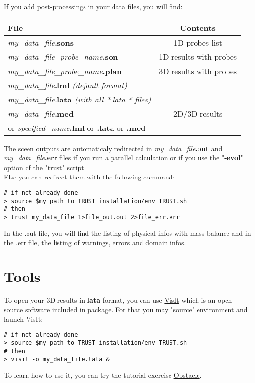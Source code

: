 If you add post-processings in your data files, you will find:

\begin{longtable}{|l|c|}
\hline \textbf{File}                                    & \textbf{Contents} \\ \hline \hline
\textit{my\_data\_file}\textbf{.sons}                          & 1D probes list \\ \hline
\textit{my\_data\_file\_probe\_name}\textbf{.son}              & 1D results with probes \\ \hline
\textit{my\_data\_file\_probe\_name}\textbf{.plan}             & 3D results with probes\\ \hline
\textit{my\_data\_file}\textbf{.lml} \textit{(default format)}             & \\
\textit{my\_data\_file}\textbf{.lata} \textit{(with all *.lata.* files)}   & \\
\textit{my\_data\_file}\textbf{.med}                                       & 2D/3D results \\
or \textit{specified\_name}\textbf{.lml} or \textbf{.lata} or \textbf{.med}  & \\ \hline
\end{longtable}

The sceen outputs are automaticaly redirected in \textit{my\_data\_file}\textbf{.out} and \textit{my\_data\_file}\textbf{.err} files if you run a parallel calculation or if you use the "\textbf{-evol}" option of the "trust" script.\\
Else you can redirect them with the following command:
\begin{verbatim}
# if not already done
> source $my_path_to_TRUST_installation/env_TRUST.sh
# then
> trust my_data_file 1>file_out.out 2>file_err.err
\end{verbatim}

In the .out file, you will find the listing of physical infos with mass balance and in the .err file, the listing of warnings, errors and domain infos.




\section{Tools}

To open your 3D results in \textbf{lata} format, you can use \href{https://wci.llnl.gov/simulation/computer-codes/visit}{VisIt} which is an open source software included in \trust package. For that you may "source" \trust environment and launch VisIt:
\begin{verbatim}
# if not already done
> source $my_path_to_TRUST_installation/env_TRUST.sh
# then
> visit -o my_data_file.lata &
\end{verbatim}
To learn how to use it, you can try the \trust tutorial exercise \href{TRUST_tutorial.pdf\#exo1}{Obstacle}. \\

